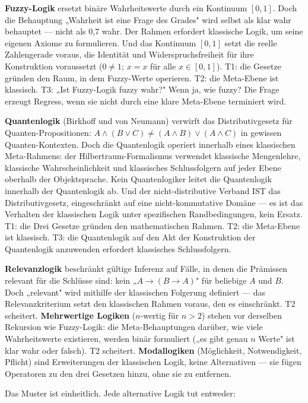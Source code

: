 \documentclass[10pt, openany, oneside]{book}
\begin{document}
\textbf{Fuzzy-Logik} ersetzt binäre Wahrheitswerte durch ein Kontinuum $[0, 1]$. Doch die Behauptung „Wahrheit ist eine Frage des Grades" wird selbst als klar wahr behauptet --- nicht als 0,7 wahr. Der Rahmen erfordert klassische Logik, um seine eigenen Axiome zu formulieren. Und das Kontinuum $[0, 1]$ setzt die reelle Zahlengerade voraus, die Identität und Widerspruchsfreiheit für ihre Konstruktion voraussetzt ($0 \neq 1$; $x = x$ für alle $x \in [0,1]$). T1: die Gesetze gründen den Raum, in dem Fuzzy-Werte operieren. T2: die Meta-Ebene ist klassisch. T3: „Ist Fuzzy-Logik fuzzy wahr?" Wenn ja, wie fuzzy? Die Frage erzeugt Regress, wenn sie nicht durch eine klare Meta-Ebene terminiert wird.

\textbf{Quantenlogik} (Birkhoff und von Neumann) verwirft das Distributivgesetz für Quanten-Propositionen: $A \wedge (B \vee C) \neq (A \wedge B) \vee (A \wedge C)$ in gewissen Quanten-Kontexten. Doch die Quantenlogik operiert innerhalb eines klassischen Meta-Rahmens: der Hilbertraum-Formalismus verwendet klassische Mengenlehre, klassische Wahrscheinlichkeit und klassisches Schlussfolgern auf jeder Ebene oberhalb der Objektsprache. Kein Quantenlogiker leitet die Quantenlogik innerhalb der Quantenlogik ab. Und der nicht-distributive Verband IST das Distributivgesetz, eingeschränkt auf eine nicht-kommutative Domäne --- es ist das Verhalten der klassischen Logik unter spezifischen Randbedingungen, kein Ersatz. T1: die Drei Gesetze gründen den mathematischen Rahmen. T2: die Meta-Ebene ist klassisch. T3: die Quantenlogik auf den Akt der Konstruktion der Quantenlogik anzuwenden erfordert klassisches Schlussfolgern.

\textbf{Relevanzlogik} beschränkt gültige Inferenz auf Fälle, in denen die Prämissen relevant für die Schlüsse sind: kein „$A \to (B \to A)$" für beliebige $A$ und $B$. Doch „relevant" wird mithilfe der klassischen Folgerung definiert --- das Relevanzkriterium setzt den klassischen Rahmen voraus, den es einschränkt. T2 scheitert. \textbf{Mehrwertige Logiken} ($n$-wertig für $n > 2$) stehen vor derselben Rekursion wie Fuzzy-Logik: die Meta-Behauptungen darüber, wie viele Wahrheitswerte existieren, werden binär formuliert („es gibt genau $n$ Werte" ist klar wahr oder falsch). T2 scheitert. \textbf{Modallogiken} (Möglichkeit, Notwendigkeit, Pflicht) sind Erweiterungen der klassischen Logik, keine Alternativen --- sie fügen Operatoren zu den drei Gesetzen hinzu, ohne sie zu entfernen.

Das Muster ist einheitlich. Jede alternative Logik tut entweder:
\end{document}
